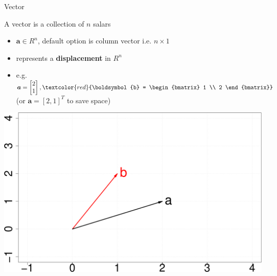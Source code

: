 \documentclass[ignorenonframetext,]{beamer}
\providecommand{\tightlist}{%
  \setlength{\itemsep}{0pt}\setlength{\parskip}{0pt}}
\newcommand{\vv}[1]{\boldsymbol{#1}}
\begin{document}
\begin{frame}{Vector}
\protect\hypertarget{vector}{}

A vector is a collection of \(n\) salars

\begin{itemize}
\tightlist
\item
  \(\vv{a} \in R^n\), default option is column vector i.e. \(n\times 1\)
\item
  represents a \textbf{displacement} in \(R^n\)
\item
  e.g.
  \(\vv{a} = \begin{bmatrix}  2 \\  1  \end{bmatrix}, \textcolor{red}{\vv{b} = \begin{bmatrix}  1 \\  2  \end{bmatrix}}\)
  (or \(\vv{a} = [2, 1]^T\) to save space) \bigskip   
\end{itemize}

\begin{center}\includegraphics[width=0.49\linewidth]{math4ml_files/figure-beamer/figures-side-1} \end{center}

\end{frame}
\end{document}
